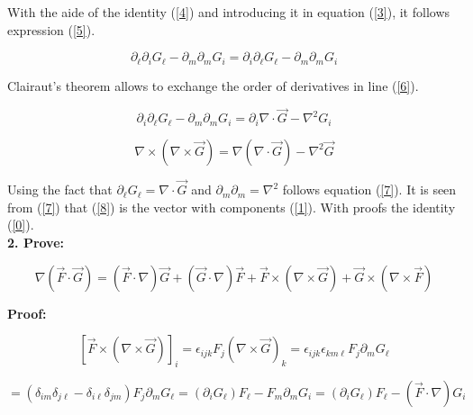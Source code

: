 \documentclass[oneside]{book}
\begin{document}
With the aide of the identity (\ref{4}) and introducing it in equation (\ref{3}), it follows expression (\ref{5}).

\begin{equation}
\label{6} \partial_{\ell} \partial_{i} G_{\ell} - \partial_{m} \partial_{m} G_{i} =   \partial_{i}\partial_{\ell} G_{\ell} - \partial_{m} \partial_{m} G_{i} 
\end{equation}

Clairaut's theorem allows to exchange the order of derivatives in line (\ref{6}). 



\begin{equation}
\label{7}  \partial_{i}\partial_{\ell} G_{\ell} - \partial_{m} \partial_{m} G_{i} =  \partial_{i} \nabla \cdot \vec{G} - \nabla^2 G_{i}
\end{equation}

\begin{equation}
\label{8}  \nabla \times (\nabla \times \vec{G}) = \nabla (\nabla \cdot \vec{G}) - \nabla^2 \vec{G}
\end{equation}

Using the fact that $\partial_{\ell} G_{\ell} =  \nabla \cdot \vec{G} $ and $  \partial_{m} \partial_{m} = \nabla^2 $ follows equation (\ref{7}). It is seen from (\ref{7}) that (\ref{8}) is the vector with components (\ref{1}). With proofs the identity (\ref{0}).\\


\textbf{2. Prove:}


\begin{equation}
\label{9} \nabla (\vec{F} \cdot \vec{G}) = (\vec{F} \cdot \nabla) \vec{G} + (\vec{G} \cdot \nabla)\vec{F} + \vec{F} \times (\nabla \times \vec{G}) + \vec{G} \times (\nabla \times \vec{F})
\end{equation}

\textbf{Proof:}


\begin{equation}
\label{10} [\vec{F} \times (\nabla \times \vec{G})]_i = \epsilon_{ijk} F_j (\nabla \times \vec{G})_k =\epsilon_{ijk} \epsilon_{km\ell} F_j \partial_m G_{\ell}
\end{equation}

\begin{equation}
\label{11} =( \delta_{im} \delta_{j\ell} - \delta_{i \ell} \delta_{jm} ) F_j \partial_m G_{\ell} =( \partial_i G_{\ell} )F_{\ell} - F_{m} \partial_{m} G_i = ( \partial_i G_{\ell} )F_{\ell} - (\vec{F} \cdot \nabla) G_i
\end{equation}
\end{document}
